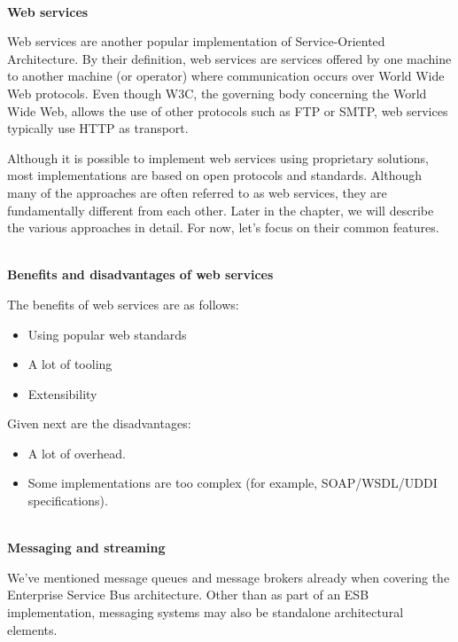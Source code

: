 \hspace*{\fill} \\ %
\noindent
\textbf{Web services}

Web services are another popular implementation of Service-Oriented Architecture. By their definition, web services are services offered by one machine to another machine (or operator) where communication occurs over World Wide Web protocols. Even though W3C, the governing body concerning the World Wide Web, allows the use of other protocols such as FTP or SMTP, web services typically use HTTP as transport.

Although it is possible to implement web services using proprietary solutions, most implementations are based on open protocols and standards. Although many of the approaches are often referred to as web services, they are fundamentally different from each other. Later in the chapter, we will describe the various approaches in detail. For now, let's focus on their common features.

\hspace*{\fill} \\ %
\noindent
\textbf{Benefits and disadvantages of web services}

The benefits of web services are as follows:

\begin{itemize}
\item 
Using popular web standards

\item 
A lot of tooling

\item 
Extensibility
\end{itemize}

Given next are the disadvantages:

\begin{itemize}
\item 
A lot of overhead.

\item 
Some implementations are too complex (for example, SOAP/WSDL/UDDI specifications).
\end{itemize}


\hspace*{\fill} \\ %
\noindent
\textbf{Messaging and streaming}

We've mentioned message queues and message brokers already when covering the Enterprise Service Bus architecture. Other than as part of an ESB implementation, messaging systems may also be standalone architectural elements.

